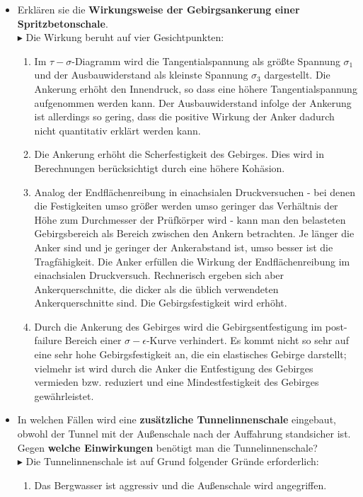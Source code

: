 \documentclass[fleqn,twoside]{article}
\begin{document}
\begin{small}
\begin{itemize}
    \item Erklären sie die \textbf{Wirkungsweise der Gebirgsankerung einer Spritzbetonschale}.\\
    $\blacktriangleright$ Die Wirkung beruht auf vier Gesichtpunkten:
    \begin{enumerate}
        \item Im $\tau - \sigma$-Diagramm wird die Tangentialspannung als größte Spannung $\sigma_1$ und der Ausbauwiderstand als kleinste Spannung $\sigma_3$ dargestellt. Die Ankerung erhöht den Innendruck, so dass eine höhere Tangentialspannung aufgenommen werden kann. Der Ausbauwiderstand infolge der Ankerung ist allerdings so gering, dass die positive Wirkung der Anker dadurch nicht quantitativ erklärt werden kann.
        \item Die Ankerung erhöht die Scherfestigkeit des Gebirges. Dies wird in Berechnungen berücksichtigt durch eine höhere Kohäsion.
        \item Analog der Endflächenreibung in einachsialen Druckversuchen - bei denen die Festigkeiten umso größer werden umso geringer das Verhältnis der Höhe zum Durchmesser der Prüfkörper wird - kann man den belasteten Gebirgsbereich als Bereich zwischen den Ankern betrachten. Je länger die Anker sind und je geringer der Ankerabstand ist, umso besser ist die Tragfähigkeit. Die Anker erfüllen die Wirkung der Endflächenreibung im einachsialen Druckversuch. Rechnerisch ergeben sich aber Ankerquerschnitte, die dicker als die üblich verwendeten Ankerquerschnitte sind. Die Gebirgsfestigkeit wird erhöht.
        \item Durch die Ankerung des Gebirges wird die Gebirgsentfestigung im post-failure Bereich einer $\sigma - \epsilon$-Kurve verhindert. Es kommt nicht so sehr auf eine sehr hohe Gebirgsfestigkeit an, die ein elastisches Gebirge darstellt; vielmehr ist wird durch die Anker die Entfestigung des Gebirges vermieden bzw. reduziert und eine Mindestfestigkeit des Gebirges gewährleistet.
    \end{enumerate}    
    \item In welchen Fällen wird eine \textbf{zusätzliche Tunnelinnenschale} eingebaut, obwohl der Tunnel mit der Außenschale nach der Auffahrung standsicher ist. Gegen \textbf{welche Einwirkungen} benötigt man die Tunnelinnenschale?\\
    $\blacktriangleright$ Die Tunnelinnenschale ist auf Grund folgender Gründe erforderlich:
    \begin{enumerate}
        \item Das Bergwasser ist aggressiv und die Außenschale wird angegriffen.

\end{enumerate}
\end{itemize}
\end{small}
\end{document}
